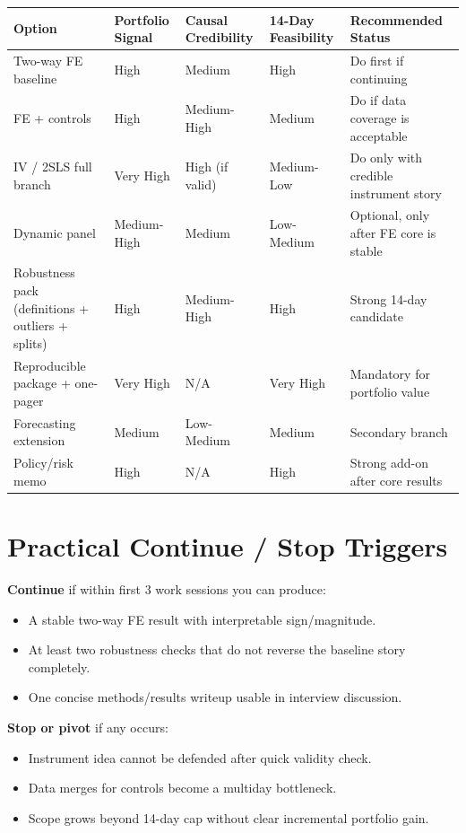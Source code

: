 \documentclass[11pt]{article}
\begin{document}
\begin{center}
\begin{tabular}{p{4.0cm}p{2.0cm}p{2.0cm}p{2.2cm}p{3.2cm}}
\toprule
Option & Portfolio Signal & Causal Credibility & 14-Day Feasibility & Recommended Status \\
\midrule
Two-way FE baseline & High & Medium & High & Do first if continuing \\
FE + controls & High & Medium-High & Medium & Do if data coverage is acceptable \\
IV / 2SLS full branch & Very High & High (if valid) & Medium-Low & Do only with credible instrument story \\
Dynamic panel & Medium-High & Medium & Low-Medium & Optional, only after FE core is stable \\
Robustness pack (definitions + outliers + splits) & High & Medium-High & High & Strong 14-day candidate \\
Reproducible package + one-pager & Very High & N/A & Very High & Mandatory for portfolio value \\
Forecasting extension & Medium & Low-Medium & Medium & Secondary branch \\
Policy/risk memo & High & N/A & High & Strong add-on after core results \\
\bottomrule
\end{tabular}
\end{center}

\section{Practical Continue / Stop Triggers}
\textbf{Continue} if within first 3 work sessions you can produce:
\begin{itemize}
\item A stable two-way FE result with interpretable sign/magnitude.
\item At least two robustness checks that do not reverse the baseline story completely.
\item One concise methods/results writeup usable in interview discussion.
\end{itemize}

\textbf{Stop or pivot} if any occurs:
\begin{itemize}
\item Instrument idea cannot be defended after quick validity check.
\item Data merges for controls become a multiday bottleneck.
\item Scope grows beyond 14-day cap without clear incremental portfolio gain.
\end{itemize}
\end{document}
